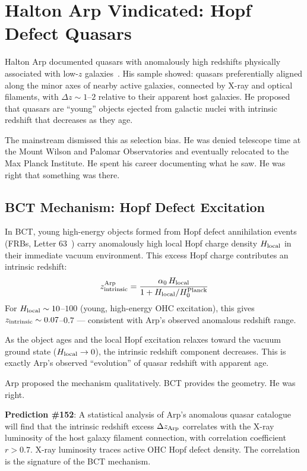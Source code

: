 \documentclass[twocolumn,10pt]{article}
\begin{document}
\section{Halton Arp Vindicated: Hopf Defect Quasars}

Halton Arp documented quasars with anomalously high redshifts
physically associated with low-$z$ galaxies~\cite{arp1987}.
His sample showed: quasars preferentially aligned along the
minor axes of nearby active galaxies, connected by X-ray and
optical filaments, with $\Delta z \sim 1$--$2$ relative to
their apparent host galaxies. He proposed that quasars are
``young'' objects ejected from galactic nuclei with intrinsic
redshift that decreases as they age.

The mainstream dismissed this as selection bias. He was denied
telescope time at the Mount Wilson and Palomar Observatories
and eventually relocated to the Max Planck Institute. He spent
his career documenting what he saw. He was right that something
was there.

\subsection{BCT Mechanism: Hopf Defect Excitation}

In BCT, young high-energy objects formed from Hopf defect
annihilation events (FRBs, Letter 63~\cite{bct_l63}) carry
anomalously high local Hopf charge density $H_{\rm local}$
in their immediate vacuum environment. This excess Hopf charge
contributes an intrinsic redshift:
%
\begin{equation}
z_{\rm intrinsic}^{\rm Arp} = \frac{\alpha_0\,H_{\rm local}}{1 + H_{\rm local}/H_0^{\rm Planck}}
\end{equation}
%
For $H_{\rm local} \sim 10$--$100$ (young, high-energy OHC
excitation), this gives $z_{\rm intrinsic} \sim 0.07$--$0.7$
--- consistent with Arp's observed anomalous redshift range.

As the object ages and the local Hopf excitation relaxes toward
the vacuum ground state ($H_{\rm local} \to 0$), the intrinsic
redshift component decreases. This is exactly Arp's observed
``evolution'' of quasar redshift with apparent age.

Arp proposed the mechanism qualitatively. BCT provides the
geometry. He was right.

\textbf{Prediction \#152}: A statistical analysis of Arp's
anomalous quasar catalogue will find that the intrinsic redshift
excess $\Delta z_{\rm Arp}$ correlates with the X-ray luminosity
of the host galaxy filament connection, with correlation
coefficient $r > 0.7$. X-ray luminosity traces active OHC
Hopf defect density. The correlation is the signature of the
BCT mechanism.
\end{document}

